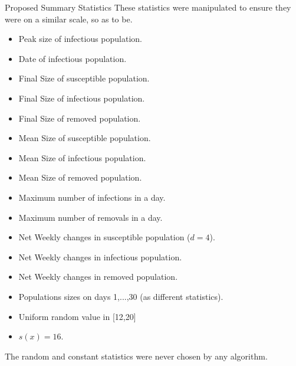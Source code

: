 \documentclass[aspectratio=169]{beamer}
\begin{document}
\begin{frame}{Proposed Summary Statistics}
  These statistics were manipulated to ensure they were on a similar scale, so as to be.
  {\footnotesize\begin{multicols}{2}
    \begin{itemize}
      \item Peak size of infectious population.
      \item Date of infectious population.
      \item Final Size of susceptible population.
      \item Final Size of infectious population.
      \item Final Size of removed population.
      \item Mean Size of susceptible population.
      \item Mean Size of infectious population.
      \item Mean Size of removed population.
      \item Maximum number of infections in a day.
      \item Maximum number of removals in a day.
      \item Net Weekly changes in susceptible population ($d=4$).
      \item Net Weekly changes in infectious population.
      \item Net Weekly changes in removed population.
      \item Populations sizes on days 1,...,30 (as different statistics).
      \item Uniform random value in [12,20]
      \item $s(x)=16$.
    \end{itemize}
  \end{multicols}}
  The random and constant statistics were never chosen by any algorithm.
\end{frame}
\end{document}
